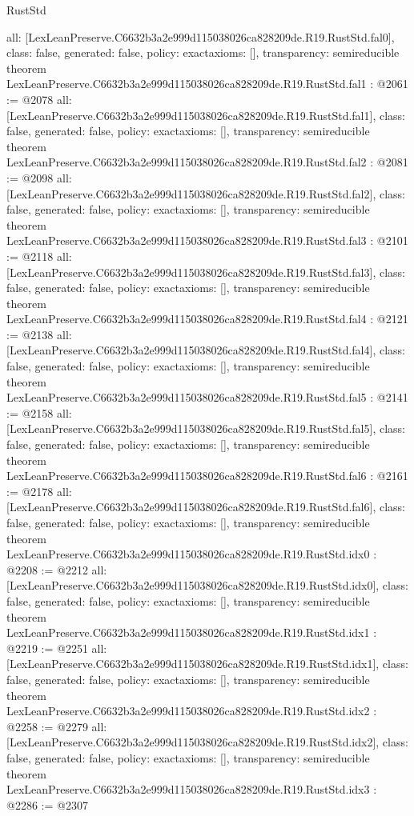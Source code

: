 \begin{lexlean}{RustStd}
\begin{coremodule}
{  all: [LexLeanPreserve.C6632b3a2e999d115038026ca828209de.R19.RustStd.fal0],
  class: false,
  generated: false,
  policy: exact{axioms: []},
  transparency: semireducible
}
theorem LexLeanPreserve.C6632b3a2e999d115038026ca828209de.R19.RustStd.fal1 : @2061 := @2078 {
  all: [LexLeanPreserve.C6632b3a2e999d115038026ca828209de.R19.RustStd.fal1],
  class: false,
  generated: false,
  policy: exact{axioms: []},
  transparency: semireducible
}
theorem LexLeanPreserve.C6632b3a2e999d115038026ca828209de.R19.RustStd.fal2 : @2081 := @2098 {
  all: [LexLeanPreserve.C6632b3a2e999d115038026ca828209de.R19.RustStd.fal2],
  class: false,
  generated: false,
  policy: exact{axioms: []},
  transparency: semireducible
}
theorem LexLeanPreserve.C6632b3a2e999d115038026ca828209de.R19.RustStd.fal3 : @2101 := @2118 {
  all: [LexLeanPreserve.C6632b3a2e999d115038026ca828209de.R19.RustStd.fal3],
  class: false,
  generated: false,
  policy: exact{axioms: []},
  transparency: semireducible
}
theorem LexLeanPreserve.C6632b3a2e999d115038026ca828209de.R19.RustStd.fal4 : @2121 := @2138 {
  all: [LexLeanPreserve.C6632b3a2e999d115038026ca828209de.R19.RustStd.fal4],
  class: false,
  generated: false,
  policy: exact{axioms: []},
  transparency: semireducible
}
theorem LexLeanPreserve.C6632b3a2e999d115038026ca828209de.R19.RustStd.fal5 : @2141 := @2158 {
  all: [LexLeanPreserve.C6632b3a2e999d115038026ca828209de.R19.RustStd.fal5],
  class: false,
  generated: false,
  policy: exact{axioms: []},
  transparency: semireducible
}
theorem LexLeanPreserve.C6632b3a2e999d115038026ca828209de.R19.RustStd.fal6 : @2161 := @2178 {
  all: [LexLeanPreserve.C6632b3a2e999d115038026ca828209de.R19.RustStd.fal6],
  class: false,
  generated: false,
  policy: exact{axioms: []},
  transparency: semireducible
}
theorem LexLeanPreserve.C6632b3a2e999d115038026ca828209de.R19.RustStd.idx0 : @2208 := @2212 {
  all: [LexLeanPreserve.C6632b3a2e999d115038026ca828209de.R19.RustStd.idx0],
  class: false,
  generated: false,
  policy: exact{axioms: []},
  transparency: semireducible
}
theorem LexLeanPreserve.C6632b3a2e999d115038026ca828209de.R19.RustStd.idx1 : @2219 := @2251 {
  all: [LexLeanPreserve.C6632b3a2e999d115038026ca828209de.R19.RustStd.idx1],
  class: false,
  generated: false,
  policy: exact{axioms: []},
  transparency: semireducible
}
theorem LexLeanPreserve.C6632b3a2e999d115038026ca828209de.R19.RustStd.idx2 : @2258 := @2279 {
  all: [LexLeanPreserve.C6632b3a2e999d115038026ca828209de.R19.RustStd.idx2],
  class: false,
  generated: false,
  policy: exact{axioms: []},
  transparency: semireducible
}
theorem LexLeanPreserve.C6632b3a2e999d115038026ca828209de.R19.RustStd.idx3 : @2286 := @2307 {
}
\end{coremodule}
\end{lexlean}
